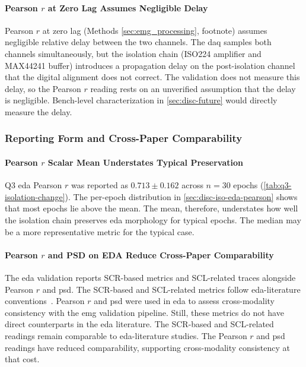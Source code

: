 \paragraph{Pearson $r$ at Zero Lag Assumes Negligible Delay}
\label{sec:disc-lim-zero-lag}

Pearson \(r\) at zero lag (Methods \autoref{sec:emg_processing}, footnote) assumes negligible relative delay between the two channels. The \gls{daq} samples both channels simultaneously, but the isolation chain (ISO224 amplifier and MAX44241 buffer) introduces a propagation delay on the post-isolation channel that the digital alignment does not correct. The validation does not measure this delay, so the Pearson \(r\) reading rests on an unverified assumption that the delay is negligible. Bench-level characterization in \autoref{sec:disc-future} would directly measure the delay.


\subsubsection{Reporting Form and Cross-Paper Comparability}
\label{sec:disc-lim-comparability}

\paragraph{Pearson $r$ Scalar Mean Understates Typical Preservation}
\label{sec:disc-lim-pearson-mean}

Q3 \gls{eda} Pearson \(r\) was reported as $\num{0.713} \pm \num{0.162}$ across $n = \num{30}$ epochs (\autoref{tab:q3-isolation-change}). The per-epoch distribution in \autoref{sec:disc-iso-eda-pearson} shows that most epochs lie above the mean. The mean, therefore, understates how well the isolation chain preserves \gls{eda} morphology for typical epochs. The median may be a more representative metric for the typical case.

\paragraph{Pearson $r$ and PSD on EDA Reduce Cross-Paper Comparability}
\label{sec:disc-lim-eda-convention}

The \gls{eda} validation reports SCR-based metrics and SCL-related traces alongside Pearson \(r\) and \gls{psd}. The SCR-based and SCL-related metrics follow \gls{eda}-literature conventions~\cite{boucsein_electrodermal_2012}. Pearson \(r\) and \gls{psd} were used in \gls{eda} to assess cross-modality consistency with the \gls{emg} validation pipeline. Still, these metrics do not have direct counterparts in the \gls{eda} literature. The SCR-based and SCL-related readings remain comparable to \gls{eda}-literature studies. The Pearson \(r\) and \gls{psd} readings have reduced comparability, supporting cross-modality consistency at that cost.

